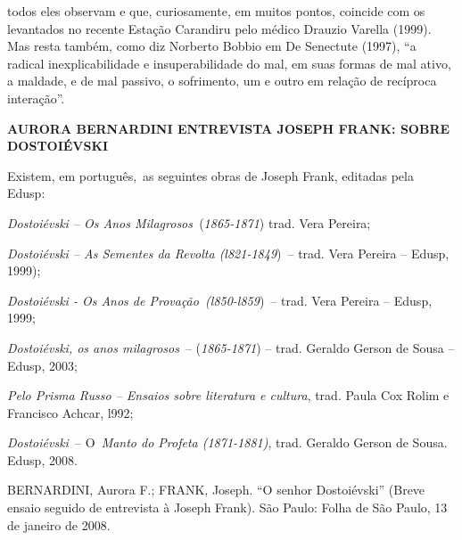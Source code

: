 todos eles observam e que, curiosamente, em muitos pontos, coincide com
os levantados no recente Estação Carandiru pelo médico Drauzio Varella
(1999). Mas resta também, como diz Norberto Bobbio em De Senectute
(1997), ``a radical inexplicabilidade e insuperabilidade do mal, em suas
formas de mal ativo, a maldade, e de mal passivo, o sofrimento, um e
outro em relação de recíproca interação''.

\textbf{AURORA BERNARDINI ENTREVISTA JOSEPH FRANK: SOBRE DOSTOIÉVSKI}

Existem, em português,~as seguintes obras de Joseph Frank, editadas pela
Edusp:~~

\emph{Dostoiévski -- Os Anos Milagrosos~}(\emph{1865-1871}) trad. Vera
Pereira;~

\emph{Dostoiévski -- As Sementes da Revolta (l821-1849})~-- trad. Vera
Pereira -- Edusp, 1999);

\emph{Dostoiévski - Os Anos de Provação~(l850-l859})~-- trad. Vera
Pereira -- Edusp, 1999;

\emph{Dostoiévski, os anos milagrosos}~-- (\emph{1865-1871}) -- trad.
Geraldo Gerson de Sousa -- Edusp, 2003;~

\emph{Pelo Prisma Russo -- Ensaios sobre literatura e cultura}, trad.
Paula Cox Rolim e Francisco Achcar, l992;\textbf{~}

\emph{Dostoiévski~}-- O~\emph{Manto do Profeta (1871-1881)}, trad.
Geraldo Gerson de Sousa. Edusp, 2008.

BERNARDINI, Aurora F.; FRANK, Joseph. ``O senhor Dostoiévski'' (Breve
ensaio seguido de entrevista à Joseph Frank). São Paulo: Folha de São
Paulo, 13 de janeiro de 2008.

